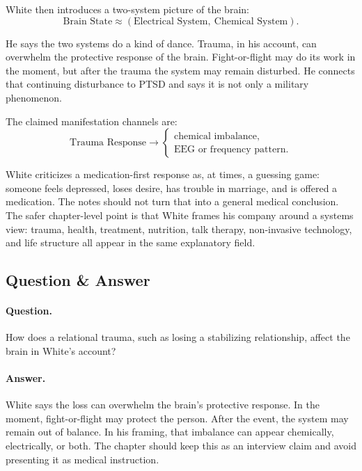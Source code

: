 White then introduces a two-system picture of the brain:
\begin{equation}
\text{Brain State}
\approx
(\text{Electrical System},\ \text{Chemical System}).
\end{equation}

He says the two systems do a kind of dance. Trauma, in his account, can overwhelm the protective response of the brain. Fight-or-flight may do its work in the moment, but after the trauma the system may remain disturbed. He connects that continuing disturbance to PTSD and says it is not only a military phenomenon.

The claimed manifestation channels are:
\begin{equation}
\text{Trauma Response}
\longrightarrow
\begin{cases}
\text{chemical imbalance},\\
\text{EEG or frequency pattern}.
\end{cases}
\end{equation}

White criticizes a medication-first response as, at times, a guessing game: someone feels depressed, loses desire, has trouble in marriage, and is offered a medication. The notes should not turn that into a general medical conclusion. The safer chapter-level point is that White frames his company around a systems view: trauma, health, treatment, nutrition, talk therapy, non-invasive technology, and life structure all appear in the same explanatory field.

\subsection{Question \& Answer}

\paragraph{Question.}
How does a relational trauma, such as losing a stabilizing relationship, affect the brain in White's account?

\paragraph{Answer.}
White says the loss can overwhelm the brain's protective response. In the moment, fight-or-flight may protect the person. After the event, the system may remain out of balance. In his framing, that imbalance can appear chemically, electrically, or both. The chapter should keep this as an interview claim and avoid presenting it as medical instruction.

